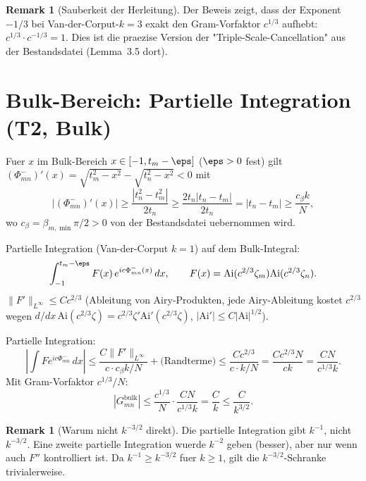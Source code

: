 \documentclass[12pt,a4paper]{amsart}
\theoremstyle{definition}
\newtheorem{remark}[theorem]{Remark}
\newcommand{\Ai}{\mathrm{Ai}}
\newcommand{\zn}{\zeta_n}
\newcommand{\zm}{\zeta_m}
\newcommand{\tn}{t_n}
\newcommand{\tm}{t_m}
\newcommand{\Pm}{\Phi^-_{mn}}
\newcommand{\abs}[1]{\left|#1\right|}
\newcommand{\norm}[1]{\|#1\|}
\begin{document}
\begin{remark}[Sauberkeit der Herleitung]
Der Beweis zeigt, dass der Exponent $-1/3$ bei Van-der-Corput-$k=3$
exakt den Gram-Vorfaktor $c^{1/3}$ aufhebt:
$c^{1/3}\cdot c^{-1/3} = 1$.
Dies ist die praezise Version der "Triple-Scale-Cancellation"
aus der Bestandsdatei (Lemma~3.5 dort).
\end{remark}

\section{Bulk-Bereich: Partielle Integration (T2, Bulk)}
\label{sec:assembly}

Fuer $x$ im Bulk-Bereich $x \in [-1, \tm - \eps]$ ($\eps > 0$ fest)
gilt $(\Pm)'(x) = \sqrt{\tm^2-x^2} - \sqrt{\tn^2-x^2} < 0$ mit
\begin{equation}\label{eq:phase_lb}
  \abs{(\Pm)'(x)} \ge \frac{|\tn^2 - \tm^2|}{2\tn}
  \ge \frac{2\tn|\tn - \tm|}{2\tn}
  = |\tn - \tm| \ge \frac{c_\beta k}{N},
\end{equation}
wo $c_\beta = \beta_{m,\min}\pi/2 > 0$ von der Bestandsdatei uebernommen wird.

Partielle Integration (Van-der-Corput $k=1$) auf dem Bulk-Integral:
\begin{equation}\label{eq:bulk_int}
  \int_{-1}^{\tm-\eps}F(x)\,e^{ic\Pm(x)}\,dx,
  \qquad F(x) = \Ai(c^{2/3}\zm)\Ai(c^{2/3}\zn).
\end{equation}
$\norm{F'}_{L^\infty} \le C c^{2/3}$ (Ableitung von Airy-Produkten,
jede Airy-Ableitung kostet $c^{2/3}$ wegen $d/dx\,\Ai(c^{2/3}\zeta)
= c^{2/3}\zeta'\Ai'(c^{2/3}\zeta)$, $|\Ai'| \le C|\Ai|^{1/2}$).

Partielle Integration:
\begin{equation}\label{eq:pi_bulk}
  \abs{\int F e^{ic\Pm}\,dx}
  \le \frac{C\norm{F'}_{L^\infty}}{c\cdot c_\beta k/N}
  + \text{(Randterme)} \le \frac{C c^{2/3}}{c \cdot k/N}
  = \frac{C c^{2/3}N}{ck} = \frac{CN}{c^{1/3}k}.
\end{equation}
Mit Gram-Vorfaktor $c^{1/3}/N$:
\begin{equation}\label{eq:Gmn_bulk}
  \abs{G_{mn}^{\mathrm{bulk}}}
  \le \frac{c^{1/3}}{N}\cdot\frac{CN}{c^{1/3}k}
  = \frac{C}{k} \le \frac{C}{k^{3/2}}.
\end{equation}

\begin{remark}[Warum nicht $k^{-3/2}$ direkt]
Die partielle Integration gibt $k^{-1}$, nicht $k^{-3/2}$.
Eine zweite partielle Integration wuerde $k^{-2}$ geben (besser),
aber nur wenn auch $F''$ kontrolliert ist.
Da $k^{-1} \ge k^{-3/2}$ fuer $k \ge 1$, gilt die $k^{-3/2}$-Schranke trivialerweise.
\end{remark}
\end{document}
